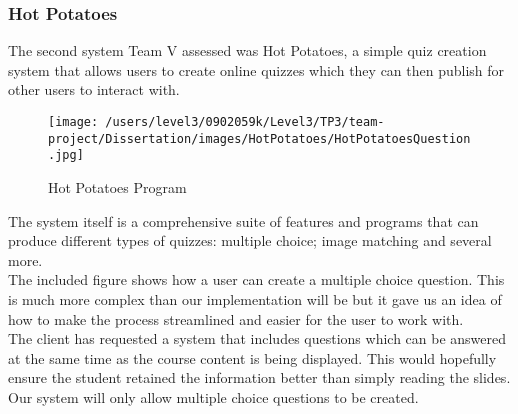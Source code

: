 \documentclass{l3proj}
\begin{document}
\subsubsection{Hot Potatoes}

The second system Team V assessed was Hot Potatoes, a simple quiz
creation system that allows users to create online quizzes which they
can then publish for other users to interact with.\\ 

\begin{figure}[!htb]
\caption{Hot Potatoes Program}
 \centering
\texttt{[image: /users/level3/0902059k/Level3/TP3/team-project/Dissertation/images/HotPotatoes/HotPotatoesQuestion.jpg]}
\end{figure}

The system itself is a comprehensive suite of features and programs
that can produce different types of quizzes: multiple choice; image
matching and several more.\\

The included figure shows how a user can create a multiple choice question. This is much more complex than our implementation will be but it gave us an idea of how to make the process streamlined and easier for the user to work with.\\ 

The client has requested a system that includes questions which can be
answered at the same time as the course content is being
displayed. This would hopefully ensure the student retained the
information better than simply reading the slides. Our system will
only allow multiple choice questions to be created.
\end{document}
